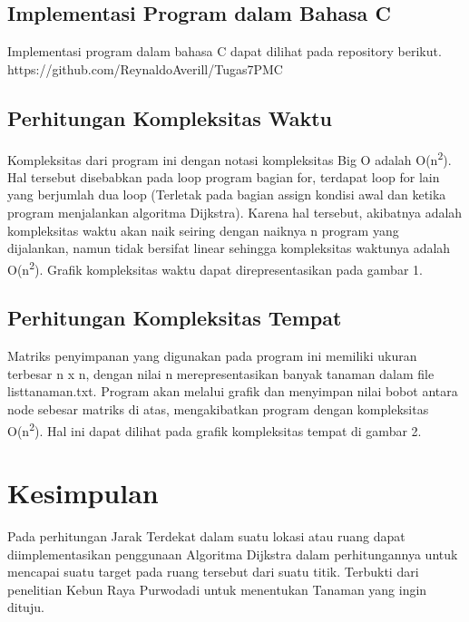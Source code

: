 \documentclass [conference] {IEEEtran}
\begin{document}
\subsection{Implementasi Program dalam Bahasa C}
Implementasi program dalam bahasa C dapat dilihat pada repository berikut. https://github.com/ReynaldoAverill/Tugas7PMC
\subsection{Perhitungan Kompleksitas Waktu}
Kompleksitas dari program ini dengan notasi kompleksitas Big O adalah O(n\textsuperscript{2}). Hal tersebut disebabkan pada loop program bagian for, terdapat loop for lain yang berjumlah dua loop (Terletak pada bagian assign kondisi awal dan ketika program menjalankan algoritma Dijkstra). Karena hal tersebut, akibatnya adalah kompleksitas waktu akan naik seiring dengan naiknya n program yang dijalankan, namun tidak bersifat linear sehingga kompleksitas waktunya adalah O(n\textsuperscript{2}). Grafik kompleksitas waktu dapat direpresentasikan pada gambar 1.

\subsection{Perhitungan Kompleksitas Tempat}
Matriks penyimpanan yang digunakan pada program ini memiliki ukuran terbesar n x n, dengan nilai n merepresentasikan banyak tanaman dalam file listtanaman.txt. Program akan melalui grafik dan menyimpan nilai bobot antara node sebesar matriks di atas, mengakibatkan program dengan kompleksitas O(n\textsuperscript{2}). Hal ini dapat dilihat pada grafik kompleksitas tempat di gambar 2.

\section{Kesimpulan}
Pada perhitungan Jarak Terdekat dalam suatu lokasi atau ruang dapat diimplementasikan penggunaan Algoritma Dijkstra dalam perhitungannya untuk mencapai suatu target pada ruang tersebut dari suatu titik. Terbukti dari penelitian Kebun Raya Purwodadi untuk menentukan Tanaman yang ingin dituju.



\end{document}

